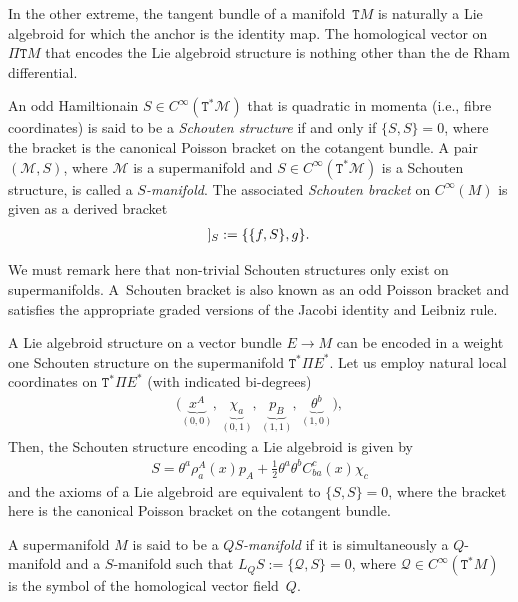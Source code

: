 \documentclass[pdftex]{sigma}
\newcommand{\Dleft}{[\hspace{-1.5pt}[}
\newcommand{\Dright}{]\hspace{-1.5pt}]}
\newcommand{\SN}[1]{\Dleft #1 \Dright}
\def\sT{{\mathtt T}}
\numberwithin{equation}{section}
\begin{document}
\begin{Example}
In the other extreme, the tangent bundle of a manifold~$\sT M$ is naturally a Lie algebroid  for which the anchor is the identity map. The homological vector on $\Pi \sT M$ that encodes the Lie algebroid structure is nothing other than the de Rham dif\/ferential.
\end{Example}


\begin{Definition}
 An odd Hamiltionain $S \in C^{\infty}(\sT^{*}\mathcal{M})$  that is quadratic in momenta (i.e., f\/ibre coordinates) is said to be a \emph{Schouten structure} if and only if $\{S,S\} = 0$, where the bracket is the canonical Poisson bracket on the cotangent bundle. A pair $(\mathcal{M},S)$, where $\mathcal{M}$ is a supermanifold and $S \in C^{\infty}(\sT^{*}{\mathcal M})$ is a Schouten structure, is called a \emph{$S$-manifold}.  The associated \emph{Schouten bracket} on $C^{\infty}(M)$ is given  as a derived bracket
\begin{gather*}
\SN{f,g}_{S} :=  \{\{f, S\},g \}.
\end{gather*}
\end{Definition}

We must remark here that non-trivial Schouten structures only exist on supermanifolds. A~Schouten bracket is also known as an odd Poisson bracket and satisf\/ies the appropriate graded versions of the Jacobi identity and Leibniz rule.


\begin{Example}
A Lie algebroid structure on a vector bundle $E \rightarrow M$ can be encoded in a weight one  Schouten structure on the supermanifold $\sT^{*}\Pi E^{*}$. Let us employ natural local coordinates  on $\sT^{*}\Pi E^{*}$ (with indicated bi-degrees)
\begin{gather*}
\big(\underbrace{x^{A}}_{(0,0)}, \, \underbrace{\chi_{a}}_{(0,1)}, \, \underbrace{p_{B}}_{(1,1)}, \, \underbrace{\theta^{b}}_{(1,0)}\big) ,
\end{gather*}
Then, the Schouten structure encoding a Lie algebroid is given by
\begin{gather*}
S = \theta^{a}\rho_{a}^{A}(x) p_{A} + \frac{1}{2}\theta^{a}\theta^{b}C_{ba}^{c}(x) \chi_{c}
\end{gather*}
and the axioms of a Lie algebroid are equivalent to $\{ S,S\} =0$, where the bracket here is the canonical Poisson bracket on the cotangent bundle.
\end{Example}


\begin{Definition}
A supermanifold $M$ is said to be a \emph{$QS$-manifold} if it is simultaneously a $Q$-manifold and a $S$-manifold such that $L_{Q}S := \{\mathcal{Q}, S \} =0$, where $\mathcal{Q} \in C^{\infty}(\sT^{*}M)$ is the symbol of the homological vector f\/ield~$Q$.
\end{Definition}
\end{document}
